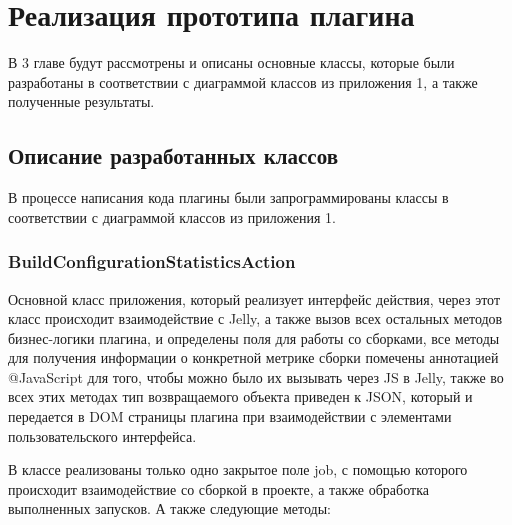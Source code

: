 \chapter{Реализация прототипа плагина} \label{ch3}

В 3 главе будут рассмотрены и описаны основные классы, которые были разработаны в соответствии с диаграммой классов из приложения 1, а также полученные результаты.

\section{Описание разработанных классов} \label{ch3:sec1}

В процессе написания кода плагины были запрограммированы классы в соответствии с диаграммой классов из приложения 1.

\subsection{BuildConfigurationStatisticsAction}

Основной класс приложения, который реализует интерфейс действия, через этот класс происходит взаимодействие с Jelly, а также вызов всех остальных методов бизнес-логики плагина, и определены поля для работы со сборками, все методы для получения информации о конкретной метрике сборки помечены аннотацией @JavaScript для того, чтобы можно было их вызывать через JS в Jelly, также во всех этих методах тип возвращаемого объекта приведен к JSON, который и передается в DOM страницы плагина при взаимодействии с элементами пользовательского интерфейса.

В классе реализованы только одно закрытое поле job, с помощью которого происходит взаимодействие со сборкой в проекте, а также обработка выполненных запусков. А также следующие методы:

